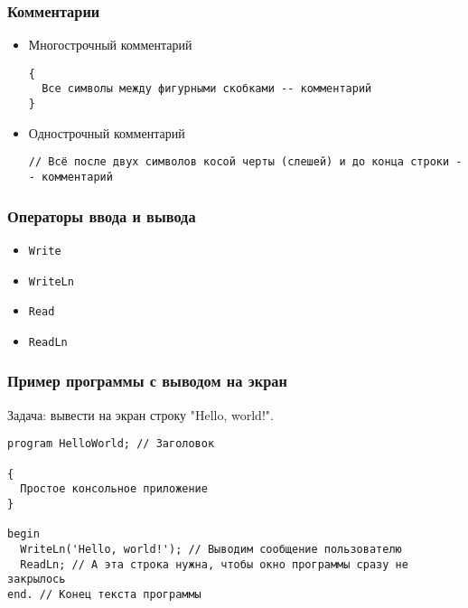 \subsubsection{Комментарии}
\begin{itemize}
\item Многострочный комментарий
\begin{verbatim}
{
  Все символы между фигурными скобками -- комментарий
}
\end{verbatim}
\item Однострочный комментарий
\begin{verbatim}
// Всё после двух символов косой черты (слешей) и до конца строки -- комментарий
\end{verbatim}
\end{itemize}

\subsubsection{Операторы ввода и вывода}
\begin{itemize}
\item \texttt{Write}
\item \texttt{WriteLn}
\item \texttt{Read}
\item \texttt{ReadLn}
\end{itemize}

\subsubsection{Пример программы с выводом на экран}
Задача: вывести на экран строку "Hello, world!".
\begin{lstlisting}[label=some-code,caption={Текст программы HelloWorld}]
program HelloWorld; // Заголовок

{
  Простое консольное приложение
}

begin
  WriteLn('Hello, world!'); // Выводим сообщение пользователю
  ReadLn; // А эта строка нужна, чтобы окно программы сразу не закрылось
end. // Конец текста программы
\end{lstlisting}


